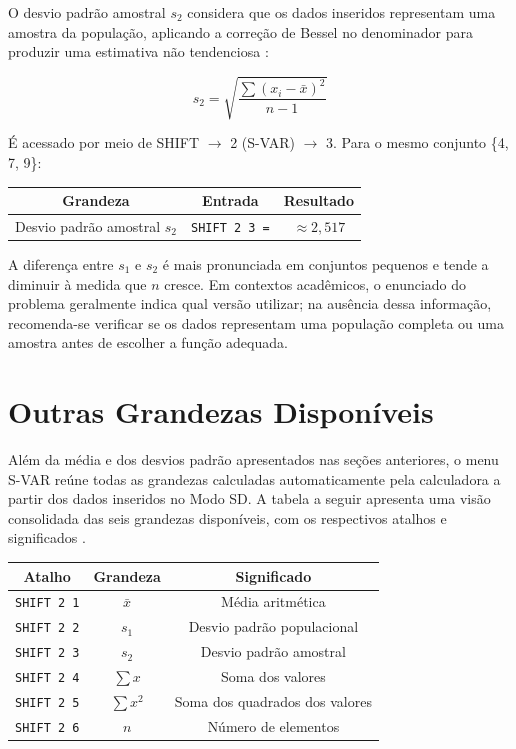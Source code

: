O desvio padrão amostral $s_2$ considera que os dados inseridos representam uma amostra da população, aplicando a correção de Bessel no denominador para produzir uma estimativa não tendenciosa \cite{casio2004}:

\[
    s_2 = \sqrt{\frac{\sum (x_i - \bar{x})^2}{n - 1}}
\]

É acessado por meio de SHIFT $\to$ 2 (S-VAR) $\to$ 3. Para o mesmo conjunto \{4, 7, 9\}:

\begin{table}[H]
    \centering
    \begin{tabular}{|c|c|c|}
        \hline
        \textbf{Grandeza} & \textbf{Entrada} & \textbf{Resultado} \\ \hline
        Desvio padrão amostral $s_2$ & \texttt{SHIFT 2 3 =} & $\approx 2{,}517$ \\ \hline
    \end{tabular}
\end{table}

A diferença entre $s_1$ e $s_2$ é mais pronunciada em conjuntos pequenos e tende a diminuir à medida que $n$ cresce. Em contextos acadêmicos, o enunciado do problema geralmente indica qual versão utilizar; na ausência dessa informação, recomenda-se verificar se os dados representam uma população completa ou uma amostra antes de escolher a função adequada.

\section{Outras Grandezas Disponíveis}

Além da média e dos desvios padrão apresentados nas seções anteriores, o menu S-VAR reúne todas as grandezas calculadas automaticamente pela calculadora a partir dos dados inseridos no Modo SD. A tabela a seguir apresenta uma visão consolidada das seis grandezas disponíveis, com os respectivos atalhos e significados \cite{casio2004}.

\begin{table}[H]
    \centering
    \begin{tabular}{|c|c|c|}
        \hline
        \textbf{Atalho} & \textbf{Grandeza} & \textbf{Significado} \\ \hline
        \texttt{SHIFT 2 1} & $\bar{x}$ & Média aritmética \\
        \texttt{SHIFT 2 2} & $s_1$ & Desvio padrão populacional \\
        \texttt{SHIFT 2 3} & $s_2$ & Desvio padrão amostral \\
        \texttt{SHIFT 2 4} & $\sum x$ & Soma dos valores \\
        \texttt{SHIFT 2 5} & $\sum x^2$ & Soma dos quadrados dos valores \\
        \texttt{SHIFT 2 6} & $n$ & Número de elementos \\ \hline
    \end{tabular}
\end{table}

